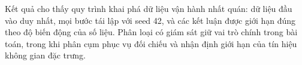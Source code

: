 Kết quả cho thấy quy trình khai phá dữ liệu vận hành nhất quán: dữ liệu đầu vào duy nhất,
mọi bước tái lập với seed 42, và các kết luận được giới hạn đúng theo độ biến động của số
liệu. Phân loại có giám sát giữ vai trò chính trong bài toán, trong khi phân cụm phục vụ
đối chiếu và nhận định giới hạn của tín hiệu không gian đặc trưng.
